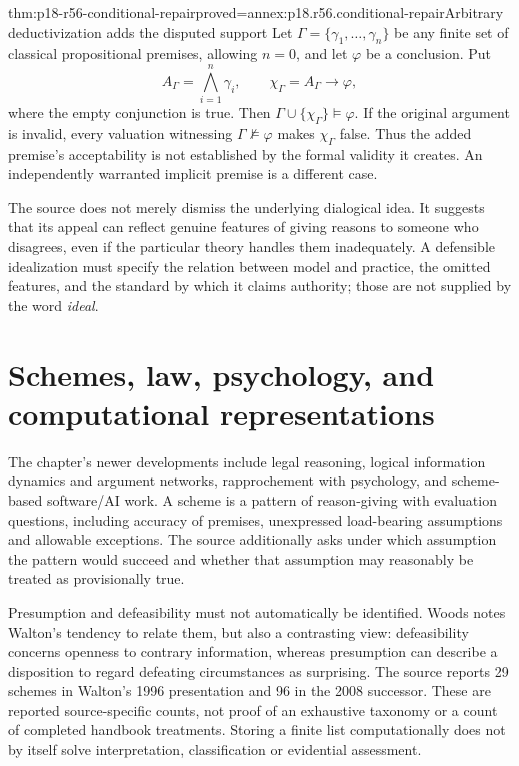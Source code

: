 \begin{hbtheorem}{thm:p18-r56-conditional-repair}{proved=annex:p18.r56.conditional-repair}{Arbitrary deductivization adds the disputed support}
Let \(\Gamma=\{\gamma_1,\ldots,\gamma_n\}\) be any finite set
of classical propositional premises, allowing \(n=0\), and let
\(\varphi\) be a conclusion. Put
\[
 A_\Gamma=\bigwedge_{i=1}^n\gamma_i,\qquad
 \chi_\Gamma=A_\Gamma\to\varphi,
\]
where the empty conjunction is true. Then
\(\Gamma\cup\{\chi_\Gamma\}\models\varphi\).
If the original argument is invalid, every valuation witnessing
\(\Gamma\not\models\varphi\) makes \(\chi_\Gamma\) false.
Thus the added premise's acceptability is not established by the
formal validity it creates. An independently warranted implicit
premise is a different case.
\end{hbtheorem}

The source does not merely dismiss the underlying dialogical idea.
It suggests that its appeal can reflect genuine features of giving
reasons to someone who disagrees, even if the particular theory handles
them inadequately. A defensible idealization must specify the relation
between model and practice, the omitted features, and the standard by
which it claims authority; those are not supplied by the word \emph{ideal}.

\section{Schemes, law, psychology, and computational representations}

The chapter's newer developments include legal reasoning, logical
information dynamics and argument networks, rapprochement with psychology,
and scheme-based software/AI work. A scheme is a pattern of reason-giving
with evaluation questions, including accuracy of premises, unexpressed
load-bearing assumptions and allowable exceptions. The source additionally
asks under which assumption the pattern would succeed and whether that
assumption may reasonably be treated as provisionally true.

Presumption and defeasibility must not automatically be identified.
Woods notes Walton's tendency to relate them, but also a contrasting
view: defeasibility concerns openness to contrary information, whereas
presumption can describe a disposition to regard defeating circumstances
as surprising. The source reports 29 schemes in Walton's 1996 presentation
and 96 in the 2008 successor. These are reported source-specific counts,
not proof of an exhaustive taxonomy or a count of completed handbook
treatments. Storing a finite list computationally does not by itself
solve interpretation, classification or evidential assessment.

